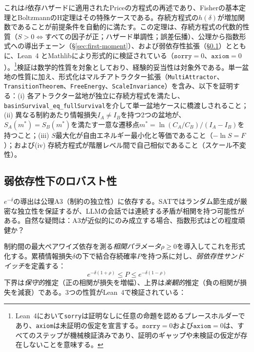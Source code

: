 \documentclass[11pt,a4paper]{article}
\begin{document}
これは$\delta$依存ハザードに適用されたPriceの方程式\cite{price1970}の再述であり、Fisherの基本定理\cite{fisher1930}とBoltzmannのH定理はその特殊ケースである。存続方程式の$h(\delta)$が増加関数であることが前提条件を自動的に満たす。この定理は、存続方程式の代数的性質（$S > 0 \Leftrightarrow$すべての因子が正；ハザード単調性；誤差伝播）、公理から指数形式への導出チェーン（\S\ref{sec:first-moment}）、および弱依存性拡張（\S\ref{sec:weak-dependence}）とともに、Lean~4 \cite{demoura2021}とMathlibにより形式的に検証されている（$\texttt{sorry} = 0$、$\texttt{axiom} = 0$）。\footnote{Lean~4において\texttt{sorry}は証明なしに任意の命題を認めるプレースホルダーであり、\texttt{axiom}は未証明の仮定を宣言する。$\texttt{sorry} = 0$および$\texttt{axiom} = 0$は、すべてのステップが機械検証済みであり、証明のギャップや未検証の仮定が存在しないことを意味する。}検証は数学的性質を対象としており、経験的妥当性は対象外である。単一盆地の性質に加え、形式化はマルチアトラクター拡張（\texttt{MultiAttractor}、\texttt{TransitionTheorem}、\texttt{FreeEnergy}、\texttt{ScaleInvariance}）を含み、以下を証明する：(i) 各アトラクター盆地が独立に存続方程式を満たし、\texttt{basinSurvival\_eq\_fullSurvival}を介して単一盆地ケースに橋渡しされること；(ii) 異なる制約あたり情報損失$I_A \neq I_B$を持つ2つの盆地が、$S_A(m^*) = S_B(m^*)$を満たす一意な遷移点$m^* = \ln(C_A/C_B)/(I_A - I_B)$を持つこと；(iii) $S$最大化が自由エネルギー最小化と等価であること（$-\ln S = F$）；および(iv) 存続方程式が階層レベル間で自己相似であること（スケール不変性）。

\subsection{弱依存性下のロバスト性}
\label{sec:weak-dependence}

$e^{-\delta}$の導出は公理A3（制約の独立性）に依存する。SATではランダム節生成が厳密な独立性を保証するが、LLMの会話では連続する矛盾が相関を持つ可能性がある。自然な疑問は：A3が近似的にのみ成立する場合、指数形式はどの程度頑健か？

制約間の最大ペアワイズ依存を測る\emph{相関パラメータ}$\rho \geq 0$を導入してこれを形式化する。累積情報損失$\delta$の下で結合存続確率$P$を持つ系に対し、\emph{弱依存性サンドイッチ}を定義する：
\begin{equation}
e^{-\delta(1+\rho)} \leq P \leq e^{-\delta(1-\rho)}
\label{eq:sandwich}
\end{equation}
下界は\emph{保守的}推定（正の相関が損失を増幅）、上界は\emph{楽観的}推定（負の相関が損失を減衰）である。3つの性質がLean~4で検証されている：
\end{document}
